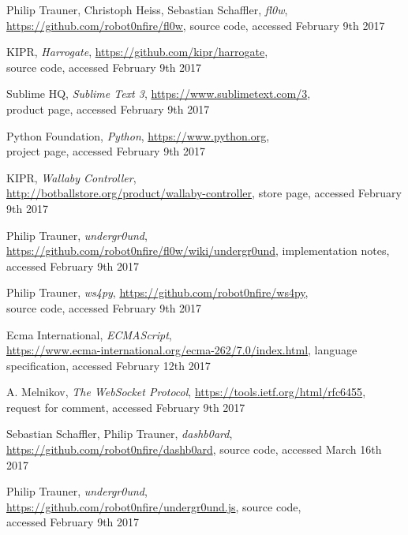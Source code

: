 \documentclass[conference,a4paper]{IEEEtran}
\begin{document}
\begin{thebibliography}{1}

Philip Trauner, Christoph Heiss, Sebastian Schaffler, \emph{fl0w}, \url{https://github.com/robot0nfire/fl0w}, source code,
accessed February 9th 2017

KIPR, \emph{Harrogate}, \url{https://github.com/kipr/harrogate}, \\ source code,
accessed February 9th 2017

Sublime HQ, \emph{Sublime Text 3}, \url{https://www.sublimetext.com/3},\\ product page,
accessed February 9th 2017

Python Foundation, \emph{Python}, \url{https://www.python.org},\\ project page,
accessed February 9th 2017

KIPR, \emph{Wallaby Controller},\\  \url{http://botballstore.org/product/wallaby-controller}, store page, accessed February 9th 2017

Philip Trauner, \emph{undergr0und}, \url{https://github.com/robot0nfire/fl0w/wiki/undergr0und}, implementation notes,
accessed February 9th 2017

Philip Trauner, \emph{ws4py}, \url{https://github.com/robot0nfire/ws4py},\\ source code,
accessed February 9th 2017

Ecma International, \emph{ECMAScript}, \\\url{https://www.ecma-international.org/ecma-262/7.0/index.html}, language specification, accessed February 12th 2017

A. Melnikov, \emph{The WebSocket Protocol}, \url{https://tools.ietf.org/html/rfc6455},\\ request for comment,
accessed February 9th 2017

Sebastian Schaffler, Philip Trauner, \emph{dashb0ard}, \url{https://github.com/robot0nfire/dashb0ard}, source code,
accessed March 16th 2017

Philip Trauner, \emph{undergr0und},\\ \url{https://github.com/robot0nfire/undergr0und.js}, source code, \\accessed February 9th 2017


\end{thebibliography}
\end{document}
